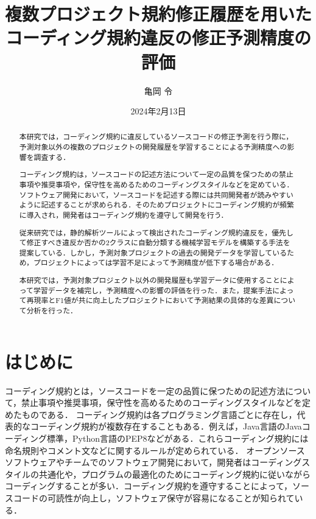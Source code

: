 \documentclass[11pt,dvipdfmx]{jreport}
\title{複数プロジェクト規約修正履歴を用いた\\コーディング規約違反の修正予測精度の評価}
\author{亀岡 令}
\date{2024年2月13日}	%
\begin{document}
\maketitle

\begin{abstract}


本研究では，コーディング規約に違反しているソースコードの修正予測を行う際に，予測対象以外の複数のプロジェクトの開発履歴を学習することによる予測精度への影響を調査する．
 
コーディング規約は，ソースコードの記述方法について一定の品質を保つための禁止事項や推奨事項や，保守性を高めるためのコーディングスタイルなどを定めている．ソフトウェア開発において，ソースコードを記述する際には共同開発者が読みやすいように記述することが求められる．そのためプロジェクトにコーディング規約が頻繁に導入され，開発者はコーディング規約を遵守して開発を行う．
 
従来研究では，静的解析ツールによって検出されたコーディング規約違反を，優先して修正すべき違反か否かの2クラスに自動分類する機械学習モデルを構築する手法を提案している．しかし，予測対象プロジェクトの過去の開発データを学習しているため，プロジェクトによっては学習不足によって予測精度が低下する場合がある．
 
本研究では，予測対象プロジェクト以外の開発履歴も学習データに使用することによって学習データを補完し，予測精度への影響の評価を行った．また，提案手法によって再現率とF1値が共に向上したプロジェクトにおいて予測結果の具体的な差異について分析を行った．


\end{abstract}

\tableofcontents



\newpage
{}	%




\chapter{はじめに}

コーディング規約とは，ソースコードを一定の品質に保つための記述方法について，禁止事項や推奨事項，保守性を高めるためのコーディングスタイルなどを定めたものである．
コーディング規約は各プログラミング言語ごとに存在し，代表的なコーディング規約が複数存在することもある．例えば，Java言語のJavaコーディング標準，Python言語のPEP8などがある．これらコーディング規約には命名規則やコメント文などに関するルールが定められている．
オープンソースソフトウェアやチームでのソフトウェア開発において，開発者はコーディングスタイルの共通化や，プログラムの最適化のためにコーディング規約に従いながらコーディングすることが多い．コーディング規約を遵守することによって，ソースコードの可読性が向上し，ソフトウェア保守が容易になることが知られている\cite{EffectsSAT}．
\end{document}
